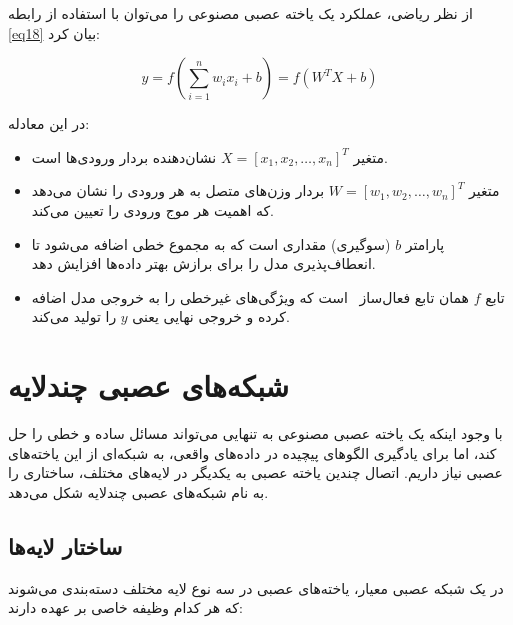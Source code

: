 از نظر ریاضی، عملکرد یک یاخته عصبی مصنوعی را می‌توان با استفاده از رابطه \eqref{eq18} بیان کرد:

\begin{equation} \label{eq18}
	y = f\left( \sum_{i=1}^{n} w_i x_i + b \right) = f(W^T X + b)
\end{equation}

در این معادله:
\begin{itemize}
	\item متغیر $X = [x_1, x_2, \dots, x_n]^T$ نشان‌دهنده بردار ورودی‌ها است.
	\item متغیر $W = [w_1, w_2, \dots, w_n]^T$ بردار وزن‌های متصل به هر ورودی را نشان می‌دهد که اهمیت هر موج ورودی را تعیین می‌کند.
	\item پارامتر $b$ (سوگیری)
	 مقداری است که به مجموع خطی اضافه می‌شود تا انعطاف‌پذیری مدل را برای برازش بهتر داده‌ها افزایش دهد.
	\item تابع $f$ همان تابع فعال‌ساز
  ~است که ویژگی‌های غیرخطی را به خروجی مدل اضافه کرده و خروجی نهایی یعنی $y$ را تولید می‌کند.
\end{itemize}


\section{شبکه‌های عصبی چندلایه}\label{sec:4-3}
با وجود اینکه یک یاخته عصبی مصنوعی به تنهایی می‌تواند مسائل ساده و خطی را حل کند، اما برای یادگیری الگوهای پیچیده در داده‌های واقعی، به شبکه‌ای از این یاخته‌های عصبی نیاز داریم. اتصال چندین یاخته عصبی به یکدیگر در لایه‌های مختلف، ساختاری را به نام شبکه‌های عصبی چندلایه شکل می‌دهد. 

\subsection{ساختار لایه‌ها}\label{subsec:4-3-1}
در یک شبکه عصبی معیار، یاخته‌های عصبی در سه نوع لایه مختلف دسته‌بندی می‌شوند که هر کدام وظیفه خاصی بر عهده دارند:

